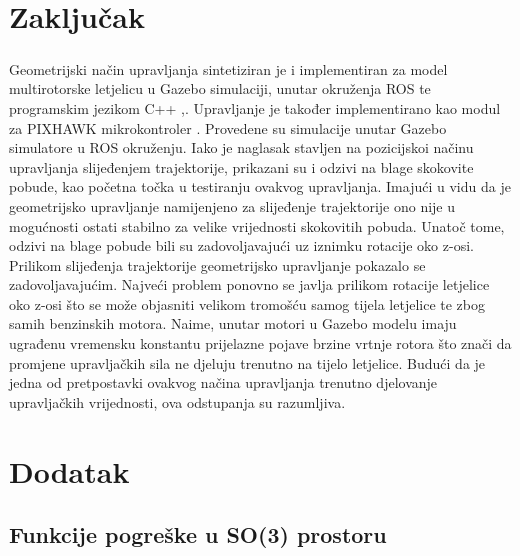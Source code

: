 \documentclass[times, utf8, diplomski, numeric]{fer}
\begin{document}
\chapter{Zaključak}
	\paragraph{}
	Geometrijski način upravljanja sintetiziran je i implementiran za model multirotorske letjelicu u Gazebo simulaciji, unutar okruženja ROS te programskim jezikom C++ \cite{gitRepo1},\cite{gitRepo2}. Upravljanje je također implementirano kao modul za PIXHAWK mikrokontroler \cite{gitRepo3}. Provedene su simulacije unutar Gazebo simulatore u ROS okruženju. Iako je naglasak stavljen na pozicijskoi načinu upravljanja slijeđenjem trajektorije, prikazani su i odzivi na blage skokovite pobude, kao početna točka u testiranju ovakvog upravljanja. Imajući u vidu da je geometrijsko upravljanje namijenjeno za slijeđenje trajektorije ono nije u mogućnosti ostati stabilno za velike vrijednosti skokovitih pobuda. Unatoč tome, odzivi na blage pobude bili su zadovoljavajući uz iznimku rotacije oko z-osi. \\
	Prilikom slijeđenja trajektorije geometrijsko upravljanje pokazalo se zadovoljavajućim. Najveći problem ponovno se javlja prilikom rotacije letjelice oko z-osi što se može objasniti velikom tromošću samog tijela letjelice te zbog samih benzinskih motora. Naime, unutar motori u Gazebo modelu imaju ugrađenu vremensku konstantu prijelazne pojave brzine vrtnje rotora što znači da promjene upravljačkih sila ne djeluju trenutno na tijelo letjelice. Budući da je jedna od pretpostavki ovakvog načina upravljanja trenutno djelovanje upravljačkih vrijednosti, ova odstupanja su razumljiva. 
	
\chapter{Dodatak}
	\section{Funkcije pogreške u SO(3) prostoru}
	
\end{document}
